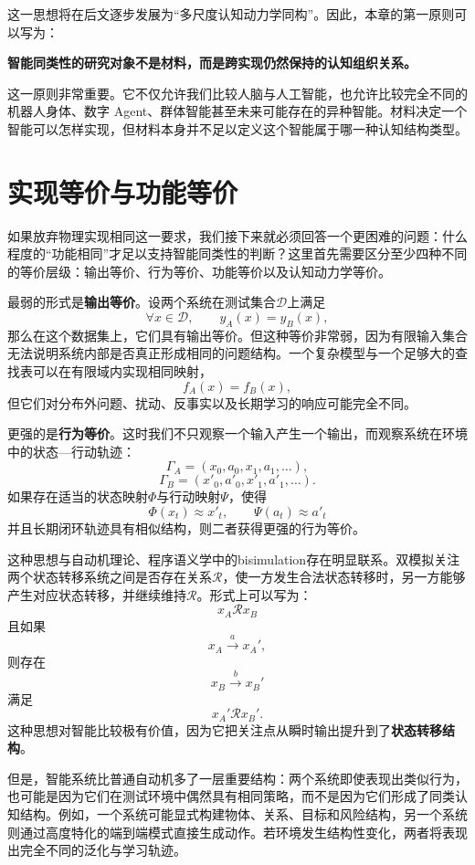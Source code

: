 这一思想将在后文逐步发展为``多尺度认知动力学同构''。因此，本章的第一原则可以写为：
\begin{proposition*}
\bfseries 智能同类性的研究对象不是材料，而是跨实现仍然保持的认知组织关系。
\end{proposition*}

这一原则非常重要。它不仅允许我们比较人脑与人工智能，也允许比较完全不同的机器人身体、数字 Agent、群体智能甚至未来可能存在的异种智能。材料决定一个智能可以怎样实现，但材料本身并不足以定义这个智能属于哪一种认知结构类型。

\section{实现等价与功能等价}

如果放弃物理实现相同这一要求，我们接下来就必须回答一个更困难的问题：什么程度的``功能相同''才足以支持智能同类性的判断？这里首先需要区分至少四种不同的等价层级：输出等价、行为等价、功能等价以及认知动力学等价。

最弱的形式是\textbf{输出等价}。设两个系统在测试集合$\mathcal D$上满足
\[
\forall x\in\mathcal D,
\qquad
y_A(x)=y_B(x),
\]
那么在这个数据集上，它们具有输出等价。但这种等价非常弱，因为有限输入集合无法说明系统内部是否真正形成相同的问题结构。一个复杂模型与一个足够大的查找表可以在有限域内实现相同映射，
\[
f_A(x)=f_B(x),
\]
但它们对分布外问题、扰动、反事实以及长期学习的响应可能完全不同。

更强的是\textbf{行为等价}。这时我们不只观察一个输入产生一个输出，而观察系统在环境中的状态—行动轨迹：
\[
\Gamma_A=
(x_0,a_0,x_1,a_1,\dots),
\]
\[
\Gamma_B=
(x'_0,a'_0,x'_1,a'_1,\dots).
\]
如果存在适当的状态映射$\Phi$与行动映射$\Psi$，使得
\[
\Phi(x_t)\approx x'_t,
\qquad
\Psi(a_t)\approx a'_t
\]
并且长期闭环轨迹具有相似结构，则二者获得更强的行为等价。

这种思想与自动机理论、程序语义学中的bisimulation存在明显联系。双模拟关注两个状态转移系统之间是否存在关系$\mathcal R$，使一方发生合法状态转移时，另一方能够产生对应状态转移，并继续维持$\mathcal R$。形式上可以写为：
\[
x_A\mathcal R x_B
\]
且如果
\[
x_A\xrightarrow{a}x_A',
\]
则存在
\[
x_B\xrightarrow{b}x_B'
\]
满足
\[
x_A'\mathcal R x_B'.
\]
这种思想对智能比较极有价值，因为它把关注点从瞬时输出提升到了\textbf{状态转移结构}。

但是，智能系统比普通自动机多了一层重要结构：两个系统即使表现出类似行为，也可能是因为它们在测试环境中偶然具有相同策略，而不是因为它们形成了同类认知结构。例如，一个系统可能显式构建物体、关系、目标和风险结构，另一个系统则通过高度特化的端到端模式直接生成动作。若环境发生结构性变化，两者将表现出完全不同的泛化与学习轨迹。

